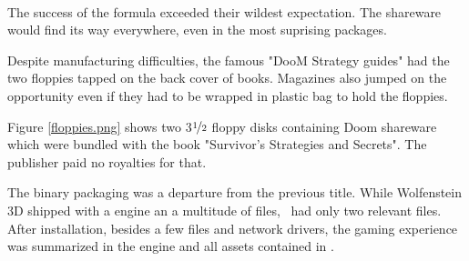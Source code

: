 \par
{}\\
\par

The success of the formula exceeded their wildest expectation. The shareware would find its way everywhere, even in the most suprising packages.\\
\par Despite manufacturing difficulties, the famous "DooM Strategy guides" had the two floppies tapped on the back cover of books. Magazines also jumped on the opportunity even if they had to be wrapped in plastic bag to hold the floppies.




\par
Figure \ref{floppies.png} shows two 3$\nicefrac{1}{2}$ floppy disks containing Doom shareware which were bundled with the book "Survivor's Strategies and Secrets". The publisher paid no royalties for that.\\
\par
The binary packaging was a departure from the previous title. While Wolfenstein 3D shipped with a  engine an a multitude of  files, \doom~had only two relevant files. After installation, besides a few  files and network drivers, the gaming experience was summarized in the engine  and all assets contained in .\\ 
\par


